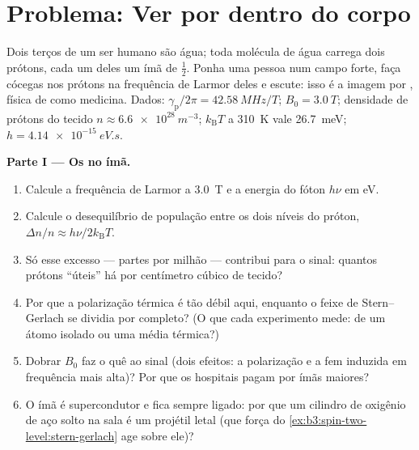 \section{Problema: Ver por dentro do corpo}

\begin{problem}\label{pb:b3:spin-two-level:1}
Dois terços de um ser humano são água; toda molécula de água carrega
dois prótons, cada um deles um ímã de  $\tfrac12$. Ponha uma pessoa
num campo forte, faça cócegas nos prótons na frequência de Larmor deles
e escute: isso é a imagem por , física de 
como medicina. Dados:
$\gamma_{\text{p}}/2\pi = \qty{42.58}{MHz/T}$; $B_0 = \qty{3.0}{T}$;
densidade de prótons do tecido $n \approx \qty{6.6e28}{m^{-3}}$;
$k_{\text{B}}T$ a \qty{310}{K} vale \qty{26.7}{meV}; $h =
\qty{4.14e-15}{eV.s}$.

\medskip\noindent\textbf{Parte I --- Os  no ímã.}
\begin{enumerate}
  \item Calcule a frequência de Larmor a \qty{3.0}{T} e a energia do
        fóton $h\nu$ em eV.
  \item Calcule o desequilíbrio de população entre os dois níveis do
        próton, $\Delta n/n \approx h\nu/2k_{\text{B}}T$.
  \item Só esse excesso --- partes por milhão --- contribui para o
        sinal: quantos prótons ``úteis'' há por centímetro cúbico de
        tecido?
  \item Por que a polarização térmica é tão débil aqui, enquanto o
        feixe de Stern--Gerlach se dividia por completo? (O que cada
        experimento mede:  de um átomo isolado ou uma média
        térmica?)
  \item Dobrar $B_0$ faz o quê ao sinal (dois efeitos: a polarização e
        a fem induzida em frequência mais alta)? Por que os hospitais
        pagam por ímãs maiores?
  \item O ímã é supercondutor e fica sempre ligado: por que um cilindro
        de oxigênio de aço solto na sala é um projétil letal (que força
        do \cref{ex:b3:spin-two-level:stern-gerlach} age sobre ele)?
\end{enumerate}


\end{problem}
